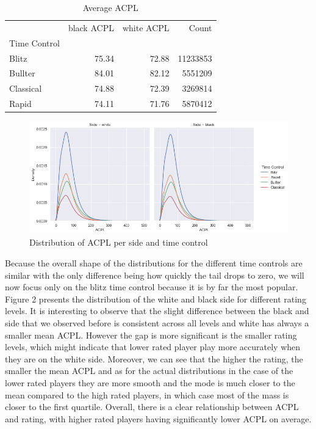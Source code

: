 \documentclass{article}
\begin{document}
\begin{table}[h]
\caption{Average ACPL}
\centering
\begin{tabular}{lrrr}

\toprule
{} &  black ACPL &  white ACPL &     Count \\
Time Control &             &             &           \\
\midrule
Blitz        &       75.34 &       72.88 &  11233853 \\
Bullter      &       84.01 &       82.12 &   5551209 \\
Classical    &       74.88 &       72.39 &   3269814 \\
Rapid        &       74.11 &       71.76 &   5870412 \\
\bottomrule
\end{tabular}
\end{table}

\begin{figure}
  \centering
  \includegraphics[width=\linewidth]{images/Fig-1.png}
  \caption{Distribution of ACPL per side and time control}
\end{figure}

Because the overall shape of the distributions for the different time controls are similar with the only difference being how quickly the tail drops to zero, we will now focus only on the blitz time control because it is by far the most popular. Figure 2 presents the distribution of the white and black side for different rating levels.
It is interesting to observe that the slight difference between the black and side that we observed before is consistent across all levels and white has always a smaller mean ACPL. However the gap is more significant is the smaller rating levels, which might indicate that lower rated player play more accurately when they are on the white side. Moreover, we can see that the higher the rating, the smaller the mean ACPL and as for the actual distributions in the case of the lower rated players they are more smooth and the mode is much closer to the mean compared to the high rated players, in which case most of the mass is closer to the first quartile. Overall, there is a clear relationship between ACPL and rating, with higher rated players having significantly lower ACPL on average.
 
\end{document}
